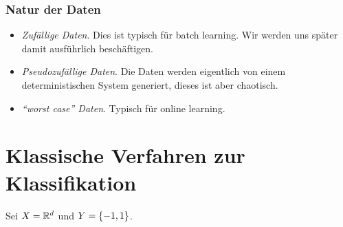 \subsubsection{Natur der Daten}

\begin{itemize}
\item \textit{Zufällige Daten}. Dies ist typisch für batch learning. Wir werden
uns später damit ausführlich beschäftigen.
\item \textit{Pseudozufällige Daten}. Die Daten werden eigentlich von einem
deterministischen System generiert, dieses ist aber chaotisch.
\item \textit{``worst case'' Daten}. Typisch für online learning.
\end{itemize}

\section{Klassische Verfahren zur Klassifikation}

Sei $X=\mathbb{R}^d$ und $Y=\left\{ -1,1 \right\}$.

